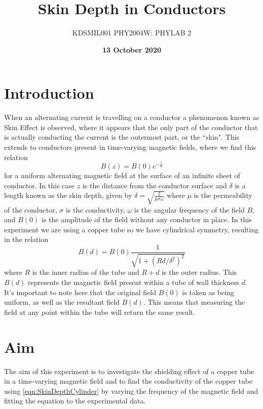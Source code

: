 \documentclass[12pt]{article}
\title{Skin Depth in Conductors}
\author{KDSMIL001 \; PHY2004W: PHYLAB 2}
\date{\textbf{13 October 2020}}
\numberwithin{equation}{section}
\numberwithin{figure}{section}
\begin{document}
    \begin{titlepage}
        \maketitle
        \center
        \tableofcontents
    \end{titlepage}
    
    \section{Introduction}\label{sec:Introduction}
    When an alternating current is travelling on a conductor a phenomenon known as 
    Skin Effect is observed, where it appears that the only part of the conductor that is 
    actually conducting the current is the outermost part, or the ``skin". This extends to 
    conductors present in time-varying magnetic fields, where we find this relation
    \begin{equation}
        B(z)=B(0)e^{-\frac{z}{\delta}}
        \label{eqn:SkinDepthSheet}
    \end{equation}
    for a uniform alternating magnetic field at the surface of an infinite sheet of conductor. 
    In this case $z$ is the distance from the conductor surface and $\delta$ is a length known 
    as the skin depth, given by $\delta=\sqrt{\frac{2}{\mu\sigma\omega}}$ where $\mu$ is the 
    permeability of the conductor, $\sigma$ is the conductivity, $\omega$ is the angular 
    frequency of the field $B$, and $B(0)$ is the amplitude of the field without any conductor 
    in place. In this experiment we are using a copper tube so we have cylindrical symmetry, 
    resulting in the relation
    \begin{equation}
        B(d)=B(0)\frac{1}{\sqrt{1+(Rd/\delta^2)^2}}
        \label{eqn:SkinDepthCylinder}
    \end{equation}
    where $R$ is the inner radius of the tube and $R+d$ is the outer radius. This $B(d)$ represents 
    the magnetic field present within a tube of wall thickness $d$. It's important to note here 
    that the original field $B(0)$ is taken as being uniform, as well as the resultant field $B(d)$. 
    This means that measuring the field at any point within the tube will return the same result. 

    \section{Aim}\label{sec:Aim}
    The aim of this experiment is to investigate the shielding effect of a copper tube in a 
    time-varying magnetic field and to find the conductivity of the copper tube using 
    \autoref{eqn:SkinDepthCylinder} by varying the frequency of the magnetic field and fitting 
    the equation to the experimental data. 
\end{document}
